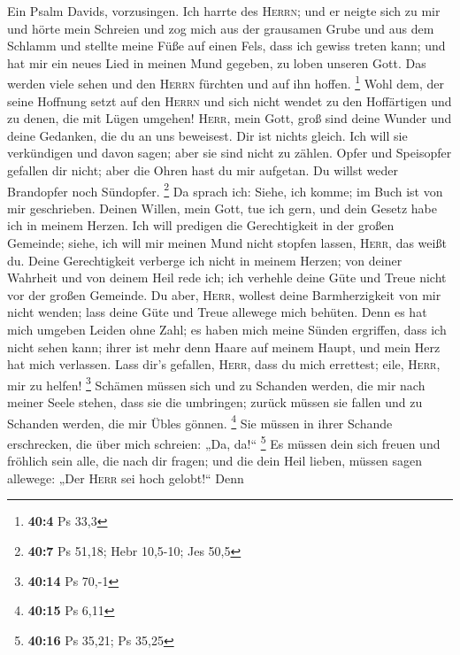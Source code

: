  Ein Psalm Davids, vorzusingen.  Ich harrte
des \textsc{Herrn}; und er neigte sich zu mir und hörte mein Schreien
 und zog mich aus der grausamen Grube und aus dem Schlamm
und stellte meine Füße auf einen Fels, dass ich gewiss treten kann;
 und hat mir ein neues Lied in meinen Mund gegeben, zu
loben unseren Gott. Das werden viele sehen und den \textsc{Herrn}
fürchten und auf ihn hoffen. \footnote{\textbf{40:4} Ps 33,3}
 Wohl dem, der seine Hoffnung setzt auf den \textsc{Herrn}
und sich nicht wendet zu den Hoffärtigen und zu denen, die mit Lügen
umgehen!  \textsc{Herr}, mein Gott, groß sind deine Wunder
und deine Gedanken, die du an uns beweisest. Dir ist nichts gleich. Ich
will sie verkündigen und davon sagen; aber sie sind nicht zu zählen.
 Opfer und Speisopfer gefallen dir nicht; aber die Ohren
hast du mir aufgetan. Du willst weder Brandopfer noch Sündopfer.
\footnote{\textbf{40:7} Ps 51,18; Hebr 10,5-10; Jes 50,5} 
Da sprach ich: Siehe, ich komme; im Buch ist von mir geschrieben.
 Deinen Willen, mein Gott, tue ich gern, und dein Gesetz
habe ich in meinem Herzen.  Ich will predigen die
Gerechtigkeit in der großen Gemeinde; siehe, ich will mir meinen Mund
nicht stopfen lassen, \textsc{Herr}, das weißt du.  Deine
Gerechtigkeit verberge ich nicht in meinem Herzen; von deiner Wahrheit
und von deinem Heil rede ich; ich verhehle deine Güte und Treue nicht
vor der großen Gemeinde.  Du aber, \textsc{Herr}, wollest
deine Barmherzigkeit von mir nicht wenden; lass deine Güte und Treue
allewege mich behüten.  Denn es hat mich umgeben Leiden
ohne Zahl; es haben mich meine Sünden ergriffen, dass ich nicht sehen
kann; ihrer ist mehr denn Haare auf meinem Haupt, und mein Herz hat mich
verlassen.  Lass dir's gefallen, \textsc{Herr}, dass du
mich errettest; eile, \textsc{Herr}, mir zu helfen! \footnote{\textbf{40:14}
  Ps 70,-1}  Schämen müssen sich und zu Schanden werden,
die mir nach meiner Seele stehen, dass sie die umbringen; zurück müssen
sie fallen und zu Schanden werden, die mir Übles gönnen. \footnote{\textbf{40:15}
  Ps 6,11}  Sie müssen in ihrer Schande erschrecken, die
über mich schreien: „Da, da!{}`` \footnote{\textbf{40:16} Ps 35,21; Ps
  35,25}  Es müssen dein sich freuen und fröhlich sein
alle, die nach dir fragen; und die dein Heil lieben, müssen sagen
allewege: „Der \textsc{Herr} sei hoch gelobt!{}``  Denn
